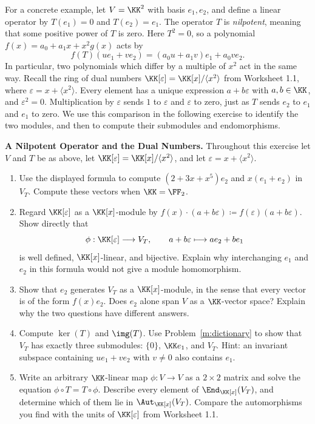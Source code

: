 \documentclass[12pt,reqno]{amsart}
\begin{document}
\hrulefill


For a concrete example, let $V=\KK^2$ with basis $e_1,e_2$, and define a linear operator by $T(e_1)=0$ and $T(e_2)=e_1$. The operator $T$ is \emph{nilpotent}, meaning that some positive power of $T$ is zero. Here $T^2=0$, so a polynomial $f(x)=a_0+a_1x+x^2g(x)$ acts by
\[
 f(T)(ue_1+ve_2)=(a_0u+a_1v)e_1+a_0ve_2.
\]
In particular, two polynomials which differ by a multiple of $x^2$ act in the same way. Recall the ring of dual numbers $\KK[\varepsilon]=\KK[x]/\langle x^2\rangle$ from Worksheet 1.1, where $\varepsilon=x+\langle x^2\rangle$. Every element has a unique expression $a+b\varepsilon$ with $a,b\in\KK$, and $\varepsilon^2=0$. Multiplication by $\varepsilon$ sends $1$ to $\varepsilon$ and $\varepsilon$ to zero, just as $T$ sends $e_2$ to $e_1$ and $e_1$ to zero. We use this comparison in the following exercise to identify the two modules, and then to compute their submodules and endomorphisms.

\hrulefill

\begin{problems}
\item\label{m:nilpotent} \textbf{A Nilpotent Operator and the Dual Numbers.} Throughout this exercise let $V$ and $T$ be as above, let $\KK[\varepsilon]=\KK[x]/\langle x^2\rangle$, and let $\varepsilon=x+\langle x^2\rangle$.
\begin{enumerate}
\item Use the displayed formula to compute $(2+3x+x^5)e_2$ and $x(e_1+e_2)$ in $V_T$. Compute these vectors when $\KK=\FF_2$.
\item Regard $\KK[\varepsilon]$ as a $\KK[x]$-module by $f(x)\cdot(a+b\varepsilon)\coloneqq f(\varepsilon)(a+b\varepsilon)$. Show directly that
\[
 \phi:\KK[\varepsilon]\longrightarrow V_T,\qquad
 a+b\varepsilon\longmapsto ae_2+be_1
\]
is well defined, $\KK[x]$-linear, and bijective. Explain why interchanging $e_1$ and $e_2$ in this formula would not give a module homomorphism.
\item Show that $e_2$ generates $V_T$ as a $\KK[x]$-module, in the sense that every vector is of the form $f(x)e_2$. Does $e_2$ alone span $V$ as a $\KK$-vector space? Explain why the two questions have different answers.
\item Compute $\ker(T)$ and $\img(T)$. Use Problem~\ref{m:dictionary} to show that $V_T$ has exactly three submodules: $\{0\}$, $\KK e_1$, and $V_T$. Hint: an invariant subspace containing $ue_1+ve_2$ with $v\ne0$ also contains $e_1$.
\item Write an arbitrary $\KK$-linear map $\phi:V\to V$ as a $2\times2$ matrix and solve the equation $\phi\circ T=T\circ\phi$. Describe every element of $\End_{\KK[x]}(V_T)$, and determine which of them lie in $\Aut_{\KK[x]}(V_T)$. Compare the automorphisms you find with the units of $\KK[\varepsilon]$ from Worksheet 1.1.
\end{enumerate}
\end{problems}
\end{document}
